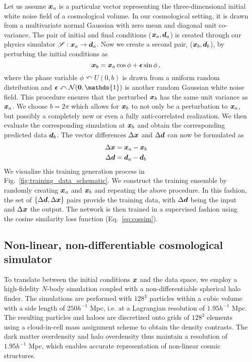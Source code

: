 Let us assume $\boldsymbol{x}_a$ is a particular vector representing the three-dimensional initial white noise field of a cosmological volume. In our cosmological setting, it is drawn from a multivariate normal Gaussian with zero mean and diagonal unit co-variance. The pair of initial and final conditions ($\boldsymbol{x}_a,\boldsymbol{d}_a$) is created through our physics simulator $\mathscr{S}: \boldsymbol{x}_a \rightarrow \boldsymbol{d}_a$. Now we create a second pair, ($\boldsymbol{x}_b,\boldsymbol{d}_b$), by perturbing the initial conditions as
\begin{equation}
    \boldsymbol{x}_b = \boldsymbol{x}_a \cos{\phi}  + \boldsymbol{\epsilon} \sin{\phi}  \, ,
    \label{eq:perturbing_ics}
\end{equation}
where the phase variable $\phi \curvearrowleft U(0,b)$ is drawn from a uniform random distribution and  $\ve{\epsilon} \curvearrowleft \mathcal{N}(\ve{0},\mathds{1})$ is another random Gaussian white noise field. This procedure ensures that the perturbed $\boldsymbol{x}_b$ has the same unit variance as $\boldsymbol{x}_a$. We choose $b=2\pi$ which allows for $\boldsymbol{x}_b$ to not only be a perturbation to $\boldsymbol{x}_a$, but possibly a completely new or even a fully anti-correlated realization. We then evaluate the corresponding simulation at $\boldsymbol{x}_b$ and obtain the corresponding predicted data $\boldsymbol{d}_b$. The vector differences $\Delta \boldsymbol{x}$ and $\Delta \boldsymbol{d}$ can now be formulated as
\begin{align}
    \Delta \boldsymbol{x} & = \boldsymbol{x}_a -\boldsymbol{x}_b\\ 
    \Delta \boldsymbol{d} & = \boldsymbol{d}_a-\boldsymbol{d}_b
\end{align}
We visualize this training generation process in Fig.~\ref{fig:training_data_schematic}. We construct the training ensemble by randomly creating $\boldsymbol{x}_a$ and $\boldsymbol{x}_b$ and repeating the above procedure. In this fashion, the set of $\{\Delta \boldsymbol{d}, \Delta \boldsymbol{x}\}$ pairs provide the training data, with $\Delta \boldsymbol{d}$ being the input and $\Delta \boldsymbol{x}$ the output. The network is then trained in a supervised fashion using the cosine similarity loss function (Eq.~\eqref{eq:cossim}). 

\subsection{Non-linear, non-differentiable cosmological simulator}
\label{sec:cosmo_sims}
To translate between the initial conditions $\boldsymbol{x}$ and the data space, we employ a high-fidelity $N$-body simulation coupled with a non-differentiable spherical halo finder. The simulations are performed with $128^3$ particles within a cubic volume with a side length of $250h^{-1}$ Mpc, i.e. at a Lagrangian resolution of $1.95h^{-1}$ Mpc. The resulting particles and haloes are discretized onto grids of $128^3$ elements using a cloud-in-cell mass assignment scheme to obtain the density contrasts. The dark matter overdensity and halo overdensity thus maintain a resolution of $1.95h^{-1}$ Mpc, which enables accurate representation of non-linear cosmic structures.

